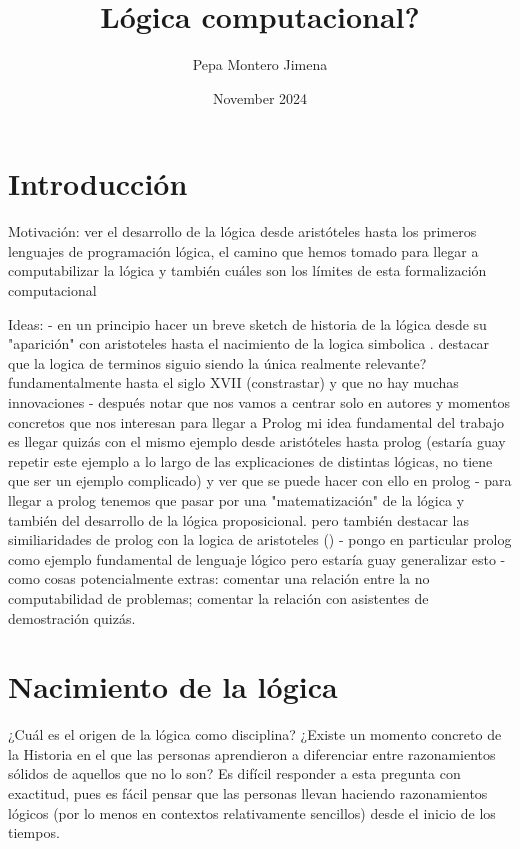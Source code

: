 \documentclass{article}
\title{Lógica computacional?}
\author{Pepa Montero Jimena}
\date{November 2024}
\begin{document}
\maketitle


\section{Introducción}

Motivación: ver el desarrollo de la lógica desde aristóteles hasta los primeros lenguajes de programación lógica, el camino que hemos tomado para llegar a computabilizar la lógica y también cuáles son los límites de esta formalización computacional

Ideas:
- en un principio hacer un breve sketch de historia de la lógica desde su "aparición" con aristoteles hasta el nacimiento de la logica simbolica . destacar que la logica de terminos siguio siendo la única realmente relevante? fundamentalmente hasta el siglo XVII (constrastar) y que no hay muchas innovaciones
- después notar que nos vamos a centrar solo en autores y momentos concretos que nos interesan para llegar a Prolog
mi idea fundamental del trabajo es llegar quizás con el mismo ejemplo desde aristóteles hasta prolog (estaría guay repetir este ejemplo a lo largo de las explicaciones de distintas lógicas, no tiene que ser un ejemplo complicado) y ver que se puede hacer con ello en prolog
- para llegar a prolog tenemos que pasar por una "matematización" de la lógica y también del desarrollo de la lógica proposicional. pero también destacar las similiaridades de prolog con la logica de aristoteles ()
- pongo en particular prolog como ejemplo fundamental de lenguaje lógico pero estaría guay generalizar esto
- como cosas potencialmente extras: comentar una relación entre la no computabilidad de problemas; comentar la relación con asistentes de demostración quizás.

\section{Nacimiento de la lógica}

¿Cuál es el origen de la lógica como disciplina? ¿Existe un momento concreto de la Historia en el que las personas aprendieron a diferenciar entre razonamientos sólidos de aquellos que no lo son? Es difícil responder a esta pregunta con exactitud, pues es fácil pensar que las personas llevan haciendo razonamientos lógicos (por lo menos en contextos relativamente sencillos) desde el inicio de los tiempos.
\end{document}
